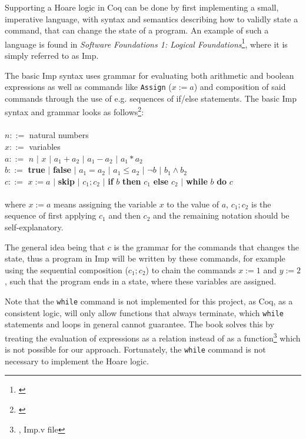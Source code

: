 Supporting a Hoare logic in Coq can be done by first implementing a small, imperative language, with syntax and semantics describing how to validly state a command, that can change the state of a program. 
An example of such a language is found in \textit{Software Foundations 1: Logical Foundations}\footnote{\textcite{SF1}}, where it is simply referred to as Imp.

The basic Imp syntax uses grammar for evaluating both arithmetic and boolean expressions as well as commands like \texttt{Assign} ($x:= a$) and composition of said commands through the use of e.g. sequences of if/else statements. 
The basic Imp syntax and grammar looks as follows\footnote{\textcite{JesperLecImp}}:
\\ \\
$n ::=$ natural numbers
\\
$x ::=$ variables
\\
$a ::=$ $n$ $|$ $x$ $|$ $a_{1} + a_{2}$ $|$ $a_{1} - a_{2}$ $|$ $a_{1} * a_{2}$
\\
$b ::=$ \textbf{true} $|$ \textbf{false} $|$ $a_{1} = a_{2}$ $|$ $a_{1} \leq a_{2}$ $|$ $\neg b$ $|$ $b_{1} \wedge b_{2}$
\\
$c ::=$ $x := a$ $|$ \textbf{skip} $|$ $c_{1};c_{2}$ $|$ \textbf{if} $b$ \textbf{then} $c_{1}$ \textbf{else} $c_{2}$ $|$ \textbf{while} $b$ \textbf{do} $c$
\\
\\
where $x:=a$ means assigning the variable $x$ to the value of $a$, $c_1;c_2$ is the sequence of first applying $c_1$ and then $c_2$ and the remaining notation should be self-explanatory. 

The general idea being that $c$ is the grammar for the commands that changes the state, thus a program in Imp will be written by these commands, for example using the sequential composition ($c_{1};c_{2}$) to chain the commands $x:= 1$ and $y:= 2$, such that the program ends in a state, where these variables are assigned.

Note that the \texttt{while} command is not implemented for this project, as Coq, as a consistent logic, will only allow functions that always terminate, which \texttt{while} statements and loops in general cannot guarantee. The book solves this by treating the evaluation of expressions as a relation instead of as a function\footnote{\textcite{SF1}, Imp.v file} which is not possible for our approach. Fortunately, the \texttt{while} command is not necessary to implement the Hoare logic.


